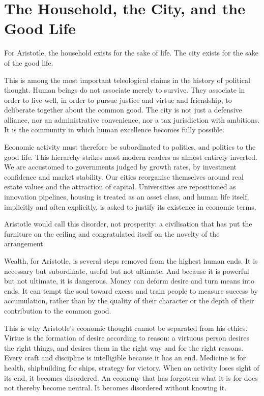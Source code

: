 \documentclass[11pt,a4paper,oneside]{book}
\begin{document}
\section*{The Household, the City, and the Good Life}

For Aristotle, the household exists for the sake of life. The city exists for the sake of the good life.

This is among the most important teleological claims in the history of political thought. Human beings do not associate merely to survive. They associate in order to live well, in order to pursue justice and virtue and friendship, to deliberate together about the common good. The city is not just a defensive alliance, nor an administrative convenience, nor a tax jurisdiction with ambitions. It is the community in which human excellence becomes fully possible.

Economic activity must therefore be subordinated to politics, and politics to the good life. This hierarchy strikes most modern readers as almost entirely inverted. We are accustomed to governments judged by growth rates, by investment confidence and market stability. Our cities reorganise themselves around real estate values and the attraction of capital. Universities are repositioned as innovation pipelines, housing is treated as an asset class, and human life itself, implicitly and often explicitly, is asked to justify its existence in economic terms.

Aristotle would call this disorder, not prosperity: a civilisation that has put the furniture on the ceiling and congratulated itself on the novelty of the arrangement.

Wealth, for Aristotle, is several steps removed from the highest human ends. It is necessary but subordinate, useful but not ultimate. And because it is powerful but not ultimate, it is dangerous. Money can deform desire and turn means into ends. It can tempt the soul toward excess and train people to measure success by accumulation, rather than by the quality of their character or the depth of their contribution to the common good.

This is why Aristotle's economic thought cannot be separated from his ethics. Virtue is the formation of desire according to reason: a virtuous person desires the right things, and desires them in the right way and for the right reasons. Every craft and discipline is intelligible because it has an end. Medicine is for health, shipbuilding for ships, strategy for victory. When an activity loses sight of its end, it becomes disordered. An economy that has forgotten what it is for does not thereby become neutral. It becomes disordered without knowing it.
\end{document}
